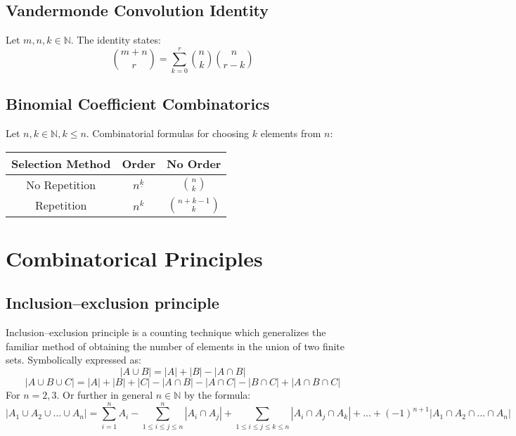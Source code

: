 \documentclass{article}
\newenvironment{definition}[1]{%
    \trivlist
    \item[\hskip\labelsep\textbf{Definition. #1.}]
    \ignorespaces
}{%
    \endtrivlist
}
\newenvironment{theorem}[1]{%
    \trivlist
    \item[\hskip\labelsep\textbf{Theorem. #1.}]
    \ignorespaces
}{%
    \endtrivlist
}
\newenvironment{information}[1]{%
    \trivlist
    \item[\hskip\labelsep\textbf{Information. #1.}]
    \ignorespaces
}{%
    \endtrivlist
}
\begin{document}
\subsection{Vandermonde Convolution Identity}

\begin{theorem}{Vandermonde's Convolution Identity}
    Let $m,n, k \in \mathbb{N}$. The identity states:
    \[\binom{m+n}{r}=\sum _{k=0}^{r}\binom{n}{k}\binom{n}{r-k}\]
\end{theorem}

\subsection{Binomial Coefficient Combinatorics}

\begin{information}{Choosing $k$ elements from $n$}
    Let $n, k \in\mathbb{N}, k\leq n$. Combinatorial formulas for choosing \( k \) elements from \( n \):
    \begin{table}[htbp]
        \centering
        \bgroup
        \def\arraystretch{1.5}%
        \begin{tabular}{|c|c|c|}
            \hline
            \textbf{Selection Method} & \textbf{Order} & \textbf{No Order} \\
            \hline
            No Repetition & \( n^{\underline{k}} \) & \( \binom{n}{k} \) \\
            \hline
            Repetition & \( n^{k} \) & \( \binom{n+k-1}{k} \) \\
            \hline
        \end{tabular}
        \egroup
    \end{table}
\end{information}

\section{Combinatorical Principles}

\subsection{Inclusion–exclusion principle}

\begin{definition}{Inclusion–exclusion principle}
    Inclusion–exclusion principle is a counting technique which generalizes the familiar method of obtaining the number of elements in the union of two finite sets. Symbolically expressed as: 
    \[|A\cup B|=|A|+|B|-|A\cap B|\]
    \[|A\cup B\cup C|=|A|+|B|+|C|-|A\cap B|-|A\cap C|-|B\cap C|+|A\cap B\cap C|\]
    For $n={2,3}$. Or further in general $n\in\mathbb{N}$ by the formula:
    \[|A_1\cup A_2\cup \dots \cup A_n| = 
    \sum_{i=1}^{n} A_i
    - \sum_{1\leq i\leq j\leq n}^{n} |A_i \cap A_j |
    + \sum_{1\leq i\leq j\leq k\leq n} |A_i \cap A_j \cap A_k|
    + \dots 
    + (-1)^{n+1} |A_1\cap A_2\cap \dots \cap A_n|\]
\end{definition}
\end{document}

